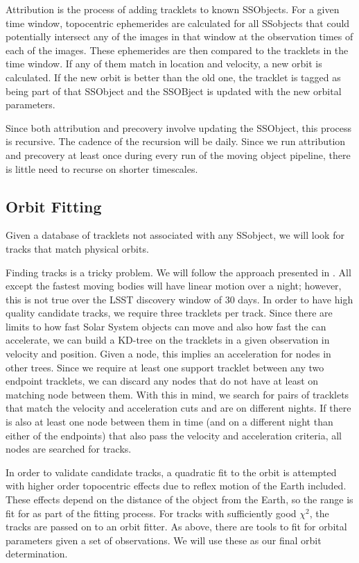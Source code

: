 Attribution is the process of adding tracklets to known SSObjects.  For a given time window, topocentric ephemerides are calculated for all SSobjects that could potentially intersect any of the images in that window at the observation times of each of the images.  These ephemerides are then compared to the tracklets in the time window.  If any of them match in location and velocity, a new orbit is calculated.  If the new orbit is better than the old one, the tracklet is tagged as being part of that SSObject and the SSOBject is updated with the new orbital parameters.

Since both attribution and precovery involve updating the SSObject, this process is recursive.  The cadence of the recursion will be daily.  Since we run attribution and precovery at least once during every run of the moving object pipeline, there is little need to recurse on shorter timescales.


\subsection{Orbit Fitting}
\label{sec:acOrbitFitting}
Given a database of tracklets not associated with any SSobject, we will look for tracks that match physical orbits.

Finding tracks is a tricky problem.  We will follow the approach presented in \cite{2007ASPC..376..395K}.  All except the fastest moving bodies will have linear motion over a night; however, this is not true over the LSST discovery window of 30 days.  In order to have high quality candidate tracks, we require three tracklets per track.  Since there are limits to how fast Solar System objects can move and also how fast the can accelerate, we can build a KD-tree on the tracklets in a given observation in velocity and position.  Given a node, this implies an acceleration for nodes in other trees.  Since we require at least one support tracklet between any two endpoint tracklets, we can discard any nodes that do not have at least on matching node between them.  With this in mind, we search for pairs of tracklets that match the velocity and acceleration cuts and are on different nights.  If there is also at least one node between them in time (and on a different night than either of the endpoints) that also pass the velocity and acceleration criteria, all nodes are searched for tracks.

In order to validate candidate tracks, a quadratic fit to the orbit is attempted with higher order topocentric effects due to reflex motion of the Earth included.  These effects depend on the distance of the object from the Earth, so the range is fit for as part of the fitting process.  For tracks with sufficiently good $\chi^2$, the tracks are passed on to an orbit fitter.  As above, there are tools to fit for orbital parameters given a set of observations.  We will use these as our final orbit determination.

